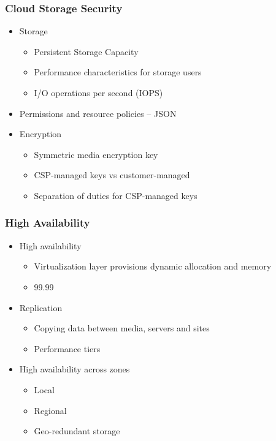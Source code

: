 		\subsubsection {Cloud Storage Security}
			\begin{itemize}
				\item Storage
					\begin{itemize}
						\item Persistent Storage Capacity
						\item Performance characteristics for storage users
						\item I/O operations per second (IOPS)
					\end{itemize}
				\item Permissions and resource policies -- JSON
				\item Encryption
					\begin{itemize}
						\item Symmetric media encryption key
						\item CSP-managed keys vs customer-managed
						\item Separation of duties for CSP-managed keys
					\end{itemize}
			\end{itemize}
		\subsubsection {High Availability}
			\begin{itemize}
				\item High availability
					\begin{itemize}
						\item Virtualization layer provisions dynamic allocation and
							memory
						\item 99.99%
					\end{itemize}
				\item Replication
					\begin{itemize}
						\item Copying data between media, servers and sites
						\item Performance tiers
					\end{itemize}
				\item High availability across zones
					\begin{itemize}
						\item Local
						\item Regional
						\item Geo-redundant storage
					\end{itemize}
			\end{itemize}

